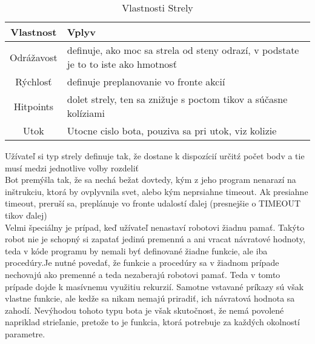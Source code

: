 \begin{table}[ht]
\caption{Vlastnosti Strely}   %
\centering                          %
\begin{tabular}{ | c | p{10cm} |}            %
\hline\hline                        %
Vlastnost & Vplyv \\   %
\hline                              %
Odrážavost & definuje, ako moc sa strela od steny odrazí, v podstate je to to iste ako hmotnosť\\ \hline
Rýchlosť & definuje preplanovanie vo fronte akcií\\ \hline
Hitpoints  & dolet strely, ten sa znižuje s poctom tikov a súčasne kolíziami\\ \hline
Utok & Utocne cislo bota, pouziva sa pri utok, viz kolizie \\ \hline
\hline                              %
\end{tabular}
\end{table}

Užívateľ si typ strely definuje tak, že dostane k dispozícií určitź počet bodv a tie musí medzi jednotlive volby rozdeliť\\
Bot premýšla tak, že sa nechá bežat dovtedy, kým z jeho program nenarazí na inštrukciu, ktorá by ovplyvnila svet, alebo kým neprsiahne timeout. Ak presiahne timeout, preruší sa, preplánuje vo fronte udalostí ďalej (presnejšie o TIMEOUT tikov ďalej)\\
Velmi špeciálny je prípad, keď užívateľ nenastaví robotovi žiadnu pamať. Takýto robot nie je schopný si zapatať jedinú premennú a ani vracat návratové hodnoty, teda v kóde programu by nemali byť definované žiadne funkcie, ale iba procedúry.Je nutné povedať, že funkcie a procedúry sa v žiadnom prípade nechovajú ako premenné a teda nezaberajú robotovi pamať. Teda v tomto prípade dojde k masívnemu využitiu rekurzií. Samotne vstavané príkazy sú však vlastne funkcie, ale kedže sa nikam nemajú priradiť, ich návratová hodnota sa zahodí. Nevýhodou tohoto typu bota je však skutočnost, že nemá povolené napriklad strieľanie, pretože to je funkcia, ktorá potrebuje za každých okolností parametre.
